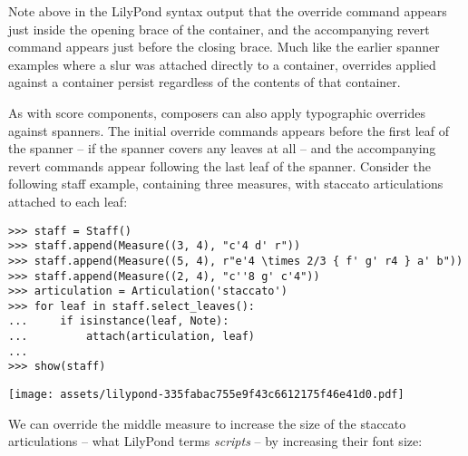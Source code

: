 \noindent Note above in the LilyPond syntax output that the override command
appears just inside the opening brace of the container, and the accompanying
revert command appears just before the closing brace. Much like the earlier
spanner examples where a slur was attached directly to a container, overrides
applied against a container persist regardless of the contents of that
container.

As with score components, composers can also apply typographic overrides
against spanners. The initial override commands appears before the first leaf
of the spanner -- if the spanner covers any leaves at all -- and the
accompanying revert commands appear following the last leaf of the spanner.
Consider the following staff example, containing three measures, with staccato
articulations attached to each leaf:

\begin{comment}
<abjad>
staff = Staff()
staff.append(Measure((3, 4), "c'4 d' r"))
staff.append(Measure((5, 4), r"e'4 \times 2/3 { f' g' r4 } a' b"))
staff.append(Measure((2, 4), "c''8 g' c'4"))
articulation = Articulation('staccato')
for leaf in staff.select_leaves():
    if isinstance(leaf, Note):
        attach(articulation, leaf)

show(staff)
</abjad>
\end{comment}

\begin{abjadbookoutput}
\begin{singlespacing}
\vspace{-0.5\baselineskip}
\begin{lstlisting}
>>> staff = Staff()
>>> staff.append(Measure((3, 4), "c'4 d' r"))
>>> staff.append(Measure((5, 4), r"e'4 \times 2/3 { f' g' r4 } a' b"))
>>> staff.append(Measure((2, 4), "c''8 g' c'4"))
>>> articulation = Articulation('staccato')
>>> for leaf in staff.select_leaves():
...     if isinstance(leaf, Note):
...         attach(articulation, leaf)
...
>>> show(staff)
\end{lstlisting}
\noindent\texttt{[image: assets/lilypond-335fabac755e9f43c6612175f46e41d0.pdf]}
\end{singlespacing}
\end{abjadbookoutput}

\noindent We can override the middle measure to increase the size of the
staccato articulations -- what LilyPond terms \emph{scripts} -- by increasing
their font size:

\begin{comment}
<abjad>
override(staff[1]).script.font_size = 10
show(staff)
</abjad>
\end{comment}

